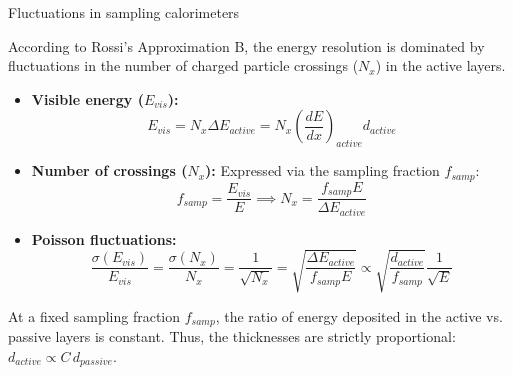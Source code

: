 \documentclass{beamer}
\begin{document}
\begin{frame}[noframenumbering]{Fluctuations in sampling calorimeters}
    
    \footnotesize %
    
    According to Rossi's Approximation B, the energy resolution is dominated by fluctuations in the number of charged particle crossings ($N_x$) in the active layers.
    
    \vspace{-0.1cm} %
    
    \begin{itemize}
        \setlength{\itemsep}{0pt} %
        
        \item \textbf{Visible energy ($E_{vis}$):}
        \vspace{-0.2cm} %
        \begin{equation*}
            E_{vis} = N_x \Delta E_{active} = N_x \left(\frac{dE}{dx}\right)_{active} d_{active}
        \end{equation*}
        
        \item \textbf{Number of crossings ($N_x$):} Expressed via the sampling fraction $f_{samp}$:
        \vspace{-0.2cm}
        \begin{equation*}
            f_{samp} = \frac{E_{vis}}{E} \implies N_x = \frac{f_{samp} E}{\Delta E_{active}}
        \end{equation*}
        
        \item \textbf{Poisson fluctuations:}
        \vspace{-0.2cm}
        \begin{equation*}
            \frac{\sigma(E_{vis})}{E_{vis}} = \frac{\sigma(N_x)}{N_x} = \frac{1}{\sqrt{N_x}} = \sqrt{\frac{\Delta E_{active}}{f_{samp} E}} \propto \sqrt{\frac{d_{active}}{f_{samp}}} \frac{1}{\sqrt{E}}
        \end{equation*}
    \end{itemize}
    
    At a fixed sampling fraction $f_{samp}$, the ratio of energy deposited in the active vs. passive layers is constant. Thus, the thicknesses are strictly proportional: $d_{active} \propto C \,d_{passive}$.
    
\end{frame}
\end{document}
